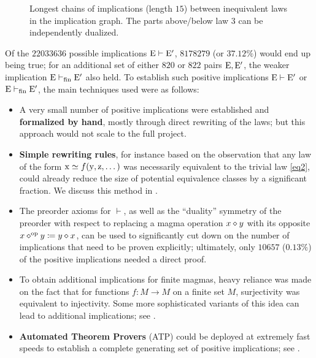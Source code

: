 \begin{figure}
{%
    }
    \caption{Longest chains of implications (length $15$) between inequivalent laws in the implication graph.  The parts above/below law 3 can be independently dualized. }
    \label{fig:longchain}
\end{figure}

Of the $\num{22033636}$ possible implications ${\mathrm{E}} \vdash {\mathrm{E}'}$, $8178279$ (or $37.12\%$) would end up being true; for an additional set of either $820$ or $822$ pairs $\mathrm{E},{\mathrm{E}'}$, the weaker implication ${\mathrm{E}} \vdash_{\mathrm{fin}} {\mathrm{E}'}$ also held. To establish such positive implications ${\mathrm{E}} \vdash {\mathrm{E}'}$ or ${\mathrm{E}} \vdash_{\mathrm{fin}} {\mathrm{E}'}$, the main techniques used were as follows:

\begin{itemize}
    \item A very small number of positive implications were established and \textbf{formalized by hand}, mostly through direct rewriting of the laws; but this approach would not scale to the full project.
    \item \textbf{Simple rewriting rules}, for instance based on the observation that any law of the form $\mathrm{x} \simeq f(\mathrm{y},\mathrm{z},\dots)$ was necessarily equivalent to the trivial law \eqref{eq2}, could already reduce the size of potential equivalence classes by a significant fraction. We discuss this method in .
    \item The preorder axioms for $\vdash$, as well as the ``duality'' symmetry of the preorder with respect to replacing a magma operation $x \diamond y$ with its opposite $x \diamond^{\mathrm{op}} y \coloneqq y \diamond x$, can be used to significantly cut down on the number of implications that need to be proven explicitly; ultimately, only $10657$ ($0.13\%$) of the positive implications needed a direct proof.
    \item To obtain additional implications for finite magmas, heavy reliance was made on the fact that for functions $f \colon M \to M$ on a finite set $M$, surjectivity was equivalent to injectivity.  Some more sophisticated variants of this idea can lead to additional implications; see .
    \item \textbf{Automated Theorem Provers} (ATP) could be deployed at extremely fast speeds to establish a complete generating set of positive implications; see .
\end{itemize}

